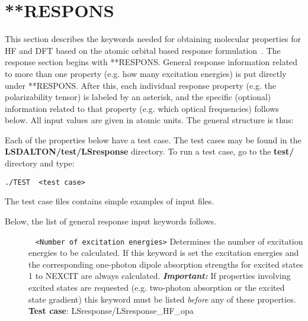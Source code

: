 \section{**RESPONS}\label{subsec:respons}
This section describes the keywords needed for obtaining molecular
properties for HF and DFT based on the atomic orbital based response formulation~\cite{thorvaldsen:214108}.
The response section begins with
**RESPONS. 
General response information related to more than one property
(e.g. how many excitation energies)
is put directly under **RESPONS.
After this,
each individual response property (e.g. the polarizability tensor)
is labeled by an asterisk, and the specific (optional) information related
to that property (e.g. which optical frequencies) follows 
below.
All input values are given in atomic units.
The general structure is thus:
\begin{description}
\item[]
\item[]
\item[]
\item[]
\item[]
\item[]
\end{description}
Each of the properties below have a test case.
The test cases may be found in the {\bf LSDALTON/test/LSresponse} directory.
To run a test case, go to the
{\bf test/} directory and type: 
\begin{description}
\item
\verb|./TEST  <test case>|
\end{description}
The test case files contains simple examples of input files.

Below, the list of general response input keywords follows.

\begin{description}
\item[] \verb| | \newline
\verb|<Number of excitation energies>|\newline
Determines the number of excitation energies to be calculated.
If this keyword is set the excitation energies 
and the corresponding one-photon dipole absorption strengths
for excited states 1 to NEXCIT are always calculated.
\emph{\bf Important:} If properties involving excited states
are requested (e.g. two-photon absorption or the excited state gradient)
this keyword must be listed \emph{before}
any of these properties. \newline
{\bf Test case}: LSresponse/LSresponse\_HF\_opa
\end{description}

